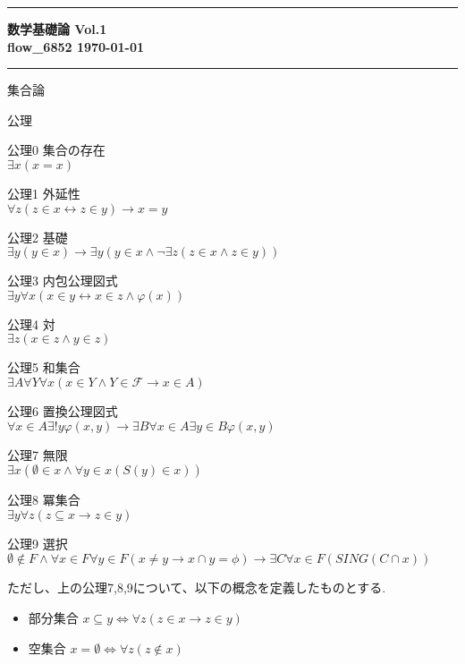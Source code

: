 \documentclass[14pt]{jsarticle}
\theoremstyle{definition}
\begin{document}
\hrule
	\begin{flushleft}
		\bfseries
			{\LARGE 数学基礎論} \hfill Vol.1 \\ \medskip
			flow\_6852 \hfill {\today}
	\end{flushleft}
\hrule
\begin{section}{集合論}
\begin{subsection}{公理}
\begin{description}
	\item{公理0} 集合の存在\\
	$\exists x ( x = x)$
	\item{公理1} 外延性\\
	$\forall z( z \in x \leftrightarrow z \in y) \to x = y$
	\item{公理2} 基礎 \\
	$\exists y(y \in x) \to \exists y ( y \in x \land \lnot \exists z(z \in x \land z \in y))$
	\item{公理3} 内包公理図式 \\
	$\exists y \forall x ( x \in y \leftrightarrow x \in z \land \varphi (x))$
	\item{公理4} 対 \\
	$\exists z ( x \in z \land y \in z)$
	\item{公理5} 和集合\\
	$\exists A \forall Y \forall x ( x \in Y \land Y \in {\mathcal F} \to x \in A)$
	\item{公理6} 置換公理図式\\
	$\forall x \in A \exists ! y \varphi(x,y) \to \exists B \forall x \in A \exists y \in B \varphi(x,y)$
	\item{公理7} 無限\\
	$\exists x (\emptyset \in x \land \forall y \in x(S(y) \in x))$
	\item{公理8} 冪集合\\
	$\exists y \forall z(z \subseteq x \to z \in y)$
	\item{公理9} 選択\\
	$\emptyset \not \in F \land \forall x \in F \forall y \in F (x \not = y \to x \cap y = \phi) \to \exists C \forall x \in F(SING(C\cap x))$
\end{description}
\clearpage
ただし、上の公理7,8,9について、以下の概念を定義したものとする.
\begin{itemize}
	\item 部分集合
	$x \subseteq y \Leftrightarrow \forall z( z \in x \to z \in y)$
	\item 空集合 
	$ x = \emptyset \Leftrightarrow \forall z ( z \not \in x)$

\end{itemize}
\end{subsection}
\end{section}
\end{document}
